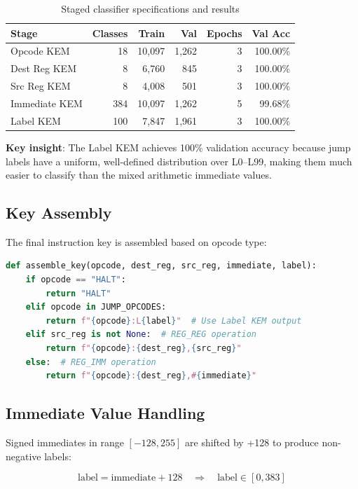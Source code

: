 \documentclass[11pt]{article}
\begin{document}
\begin{table}[h]
\centering
\begin{tabular}{lrrrrr}
\toprule
\textbf{Stage} & \textbf{Classes} & \textbf{Train} & \textbf{Val} & \textbf{Epochs} & \textbf{Val Acc} \\
\midrule
Opcode KEM & 18 & 10,097 & 1,262 & 3 & 100.00\% \\
Dest Reg KEM & 8 & 6,760 & 845 & 3 & 100.00\% \\
Src Reg KEM & 8 & 4,008 & 501 & 3 & 100.00\% \\
Immediate KEM & 384 & 10,097 & 1,262 & 5 & 99.68\% \\
Label KEM & 100 & 7,847 & 1,961 & 3 & 100.00\% \\
\bottomrule
\end{tabular}
\caption{Staged classifier specifications and results}
\end{table}

\textbf{Key insight}: The Label KEM achieves 100\% validation accuracy because jump labels have a uniform, well-defined distribution over L0--L99, making them much easier to classify than the mixed arithmetic immediate values.

\subsection{Key Assembly}

The final instruction key is assembled based on opcode type:

\begin{lstlisting}[language=Python]
def assemble_key(opcode, dest_reg, src_reg, immediate, label):
    if opcode == "HALT":
        return "HALT"
    elif opcode in JUMP_OPCODES:
        return f"{opcode}:L{label}"  # Use Label KEM output
    elif src_reg is not None:  # REG_REG operation
        return f"{opcode}:{dest_reg},{src_reg}"
    else:  # REG_IMM operation
        return f"{opcode}:{dest_reg},#{immediate}"
\end{lstlisting}

\subsection{Immediate Value Handling}

Signed immediates in range $[-128, 255]$ are shifted by +128 to produce non-negative labels:

\[
\text{label} = \text{immediate} + 128 \quad \Rightarrow \quad \text{label} \in [0, 383]
\]
\end{document}
